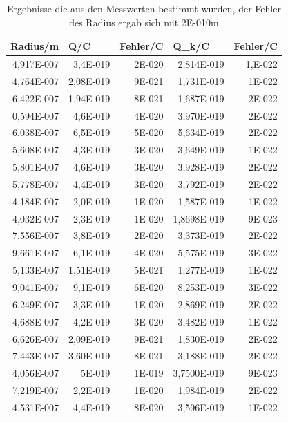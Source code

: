 \documentclass[12pt]{scrartcl}
\begin{document}
\begin{table}[H]
\caption{Ergebnisse die aus den Messwerten bestimmt wurden, der Fehler des Radius ergab sich mit 2E-010m}
\begin{center}
\begin{tabular}{|r|r|r|r|r|}
\hline
\multicolumn{1}{|l|}{Radius/m} & \multicolumn{1}{l|}{Q/C} & \multicolumn{1}{l|}{Fehler/C} & \multicolumn{1}{l|}{Q\_k/C} & \multicolumn{1}{l|}{Fehler/C} \\ \hline
4,917E-007 & 3,4E-019 & 2E-020 & 2,814E-019 & 1,E-022 \\ \hline
4,764E-007 & 2,08E-019 & 9E-021 & 1,731E-019 & 1E-022 \\ \hline
6,422E-007 & 1,94E-019 & 8E-021 & 1,687E-019 & 2E-022 \\ \hline
0,594E-007 & 4,6E-019 & 4E-020 & 3,970E-019 & 2E-022 \\ \hline
6,038E-007 & 6,5E-019 & 5E-020 & 5,634E-019 & 2E-022 \\ \hline
5,608E-007 & 4,3E-019 & 3E-020 & 3,649E-019 & 1E-022 \\ \hline
5,801E-007 & 4,6E-019 & 3E-020 & 3,928E-019 & 2E-022 \\ \hline
5,778E-007 & 4,4E-019 & 3E-020 & 3,792E-019 & 2E-022 \\ \hline
4,184E-007 & 2,0E-019 & 1E-020 & 1,587E-019 & 1E-022 \\ \hline
4,032E-007 & 2,3E-019 & 1E-020 & 1,8698E-019 & 9E-023 \\ \hline
7,556E-007 & 3,8E-019 & 2E-020 & 3,373E-019 & 2E-022 \\ \hline
9,661E-007 & 6,1E-019 & 4E-020 & 5,575E-019 & 3E-022 \\ \hline
5,133E-007 & 1,51E-019 & 5E-021 & 1,277E-019 & 1E-022 \\ \hline
9,041E-007 & 9,1E-019 & 6E-020 & 8,253E-019 & 3E-022 \\ \hline
6,249E-007 & 3,3E-019 & 1E-020 & 2,869E-019 & 2E-022 \\ \hline
4,688E-007 & 4,2E-019 & 3E-020 & 3,482E-019 & 1E-022 \\ \hline
6,626E-007 & 2,09E-019 & 9E-021 & 1,830E-019 & 2E-022 \\ \hline
7,443E-007 & 3,60E-019 & 8E-021 & 3,188E-019 & 2E-022 \\ \hline
4,056E-007 & 5E-019 & 1E-019 & 3,7500E-019 & 9E-023 \\ \hline
7,219E-007 & 2,2E-019 & 1E-020 & 1,984E-019 & 2E-022 \\ \hline
4,531E-007 & 4,4E-019 & 8E-020 & 3,596E-019 & 1E-022 \\ \hline

\end{tabular}
\end{center}
\end{table}
\end{document}
